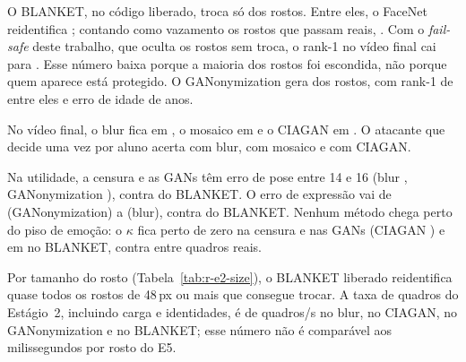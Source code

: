 O BLANKET, no código liberado, troca só  dos rostos. Entre eles, o FaceNet reidentifica ; contando como vazamento os rostos que passam reais, . Com o \emph{fail-safe} deste trabalho, que oculta os rostos sem troca, o rank-1 no vídeo final cai para . Esse número baixa porque a maioria dos rostos foi escondida, não porque quem aparece está protegido. O GANonymization gera  dos rostos, com rank-1 de  entre eles e erro de idade de  anos.

No vídeo final, o blur fica em , o mosaico em  e o CIAGAN em . O atacante que decide uma vez por aluno acerta  com blur,  com mosaico e  com CIAGAN.

Na utilidade, a censura e as GANs têm erro de pose entre 14 e 16\textdegree{} (blur \textdegree, GANonymization \textdegree), contra \textdegree{} do BLANKET. O erro de expressão vai de  (GANonymization) a  (blur), contra  do BLANKET. Nenhum método chega perto do piso de emoção: o $\kappa$ fica perto de zero na censura e nas GANs (CIAGAN ) e em  no BLANKET, contra  entre quadros reais.

Por tamanho do rosto (Tabela~\ref{tab:r-e2-size}), o BLANKET liberado reidentifica quase todos os rostos de 48\,px ou mais que consegue trocar. A taxa de quadros do Estágio~2, incluindo carga e identidades, é de  quadros/s no blur,  no CIAGAN,  no GANonymization e  no BLANKET; esse número não é comparável aos milissegundos por rosto do E5.

